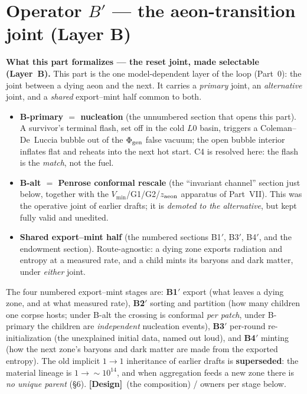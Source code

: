 \documentclass[11pt]{article}
\newcommand{\Design}{\textbf{\textcolor{purple!65!black}{[Design]}}}
\begin{document}
\clearpage

\part{Operator $B'$ --- the aeon-transition joint (Layer B)}
\setcounter{section}{0}\setcounter{equation}{0}\setcounter{figure}{0}

\noindent\textbf{What this part formalizes --- the reset joint, made selectable (Layer~B).} This part is the one model-dependent layer of the loop (Part~0): the joint between a dying aeon and the next. It carries a \emph{primary} joint, an \emph{alternative} joint, and a \emph{shared} export--mint half common to both.
\begin{itemize}[leftmargin=1.3em,itemsep=3pt]
\item \textbf{B-primary $=$ nucleation} (the unnumbered section that opens this part). A survivor's terminal flash, set off in the cold $L0$ basin, triggers a Coleman--De~Luccia bubble out of the $\Phi_{\rm gen}$ false vacuum; the open bubble interior inflates flat and reheats into the next hot start. C4 is resolved here: the flash is the \emph{match}, not the fuel.
\item \textbf{B-alt $=$ Penrose conformal rescale} (the ``invariant channel'' section just below, together with the $V_{\min}$/G1/G2/$z_{\rm aeon}$ apparatus of Part~VII). This was the operative joint of earlier drafts; it is \emph{demoted to the alternative}, but kept fully valid and unedited.
\item \textbf{Shared export--mint half} (the numbered sections B1$'$, B3$'$, B4$'$, and the endowment section). Route-agnostic: a dying zone exports radiation and entropy at a measured rate, and a child mints its baryons and dark matter, under \emph{either} joint.
\end{itemize}
The four numbered export--mint stages are: \textbf{B1$'$} export (what leaves a dying zone, and at what measured rate), \textbf{B2$'$} sorting and partition (how many children one corpse hosts; under B-alt the crossing is conformal \emph{per patch}, under B-primary the children are \emph{independent} nucleation events), \textbf{B3$'$} per-round re-initialization (the unexplained initial data, named out loud), and \textbf{B4$'$} minting (how the next zone's baryons and dark matter are made from the exported entropy). The old implicit $1\to1$ inheritance of earlier drafts is \textbf{superseded}: the material lineage is $1\to\sim\!10^{14}$, and when aggregation feeds a new zone there is \emph{no unique parent} (\S6). \Design\ (the composition) / owners per stage below.
\end{document}
